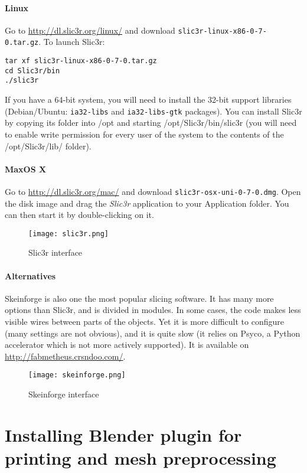 \documentclass{article}
\begin{document}
	\paragraph{Linux} Go to \url{http://dl.slic3r.org/linux/} and download \texttt{slic3r-linux-x86-0-7-0.tar.gz}. To launch Slic3r:
		\begin{verbatim}
tar xf slic3r-linux-x86-0-7-0.tar.gz
cd Slic3r/bin
./slic3r
		\end{verbatim}
	If you have a 64-bit system, you will need to install the 32-bit support libraries (Debian/Ubuntu: \texttt{ia32-libs} and \texttt{ia32-libs-gtk} packages). You can install Slic3r by copying its folder into /opt and starting /opt/Slic3r/bin/slic3r (you will need to enable write permission for every user of the system to the contents of the /opt/Slic3r/lib/ folder).

	\paragraph{MaxOS X} Go to \url{http://dl.slic3r.org/mac/} and download \texttt{slic3r-osx-uni-0-7-0.dmg}. Open the disk image and drag the \emph{Slic3r} application to your Application folder. You can then start it by double-clicking on it.

	\begin{figure}[h!]
		\centering
		\texttt{[image: slic3r.png]}
		\caption{Slic3r interface}
	\end{figure}

	\paragraph{Alternatives} Skeinforge is also one the most popular slicing software. It has many more options than Slic3r, and is divided in modules. In some cases, the code makes less visible wires between parts of the objects. Yet it is more difficult to configure (many settings are not obvious), and it is quite slow (it relies on Psyco, a Python accelerator which is not more actively supported). It is available on \url{http://fabmetheus.crsndoo.com/}.

	\begin{figure}[h!]
		\centering
		\texttt{[image: skeinforge.png]}
		\caption{Skeinforge interface}
	\end{figure}

\newpage

\section{Installing Blender plugin for printing and mesh preprocessing}
\end{document}

